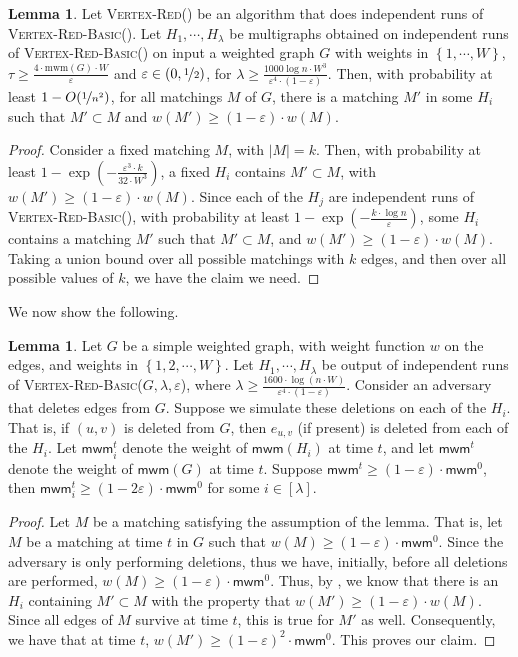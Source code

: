 \documentclass[a4paper,11pt]{article}
\newcommand{\card}[1]{|#1|}
\newcommand{\paren}[1]{\left ( #1 \right )}
\newcommand{\set}[1]{\ensuremath{\left\{ #1 \right\}}}
\newcommand{\eps}{\varepsilon}
\theoremstyle{definition}
\theoremstyle{definition}
\theoremstyle{definition}
\theoremstyle{definition}
\theoremstyle{definition}
\newtheorem{lemma2}[definition2]{Lemma}
\theoremstyle{definition}
\theoremstyle{definition}
\theoremstyle{definition}
\theoremstyle{definition}
\theoremstyle{definition}
\theoremstyle{definition}
\theoremstyle{definition}
\theoremstyle{definition}
\theoremstyle{definition}
\theoremstyle{definition}
\begin{document}
\begin{lemma2}\label{lem:matchpreserve}
Let \textsc{Vertex-Red()} be an algorithm that does independent runs of \textsc{Vertex-Red-Basic}(). Let $H_1,\cdots, H_{\lambda}$ be multigraphs obtained on independent runs of \textsc{Vertex-Red-Basic}() on input a weighted graph $G$ with weights in $\set{1,\cdots, W}$, $\tau\geqslant \frac{4\cdot \text{mwm}(G)\cdot W}{\eps}$ and $\eps\in(0,\nicefrac{1}{2})$, for $\lambda \geqslant \frac{1000\log n\cdot W^3}{\eps^4\cdot (1-\eps)}$. Then, with probability at least $1-O(\nicefrac{1}{n^2})$, for all matchings $M$ of $G$, there is a matching $M'$ in some $H_i$ such that $M'\subset M$ and $w(M')\geqslant (1-\eps)\cdot w(M)$.  
\end{lemma2}
\begin{proof}
Consider a fixed matching $M$, with $\card{M}=k$.  Then, with probability at least $1-\exp\paren{-\frac{\eps^3\cdot k}{32\cdot W^3}}$, a fixed $H_i$ contains $M'\subset M$, with $w(M')\geqslant (1-\eps)\cdot w(M)$.  Since each of the $H_j$ are independent runs of \textsc{Vertex-Red-Basic}(), with probability at least  $1-\exp\paren{-\frac{k\cdot \log n}{\eps}}$, some $H_i$ contains a matching $M'$ such that $M'\subset M$, and $w(M')\geqslant (1-\eps)\cdot w(M)$. Taking a union bound over all possible matchings with $k$ edges, and then over all possible values of $k$, we have the claim we need. 
\end{proof}
We now show the following. 
\begin{lemma2}\label{lem:matchpreserve2}
Let $G$ be a simple weighted graph, with weight function $w$ on the edges, and weights in $\set{1,2,\cdots, W}$. Let $H_1,\cdots, H_{\lambda}$ be output of independent runs of \textsc{Vertex-Red-Basic}($G,\lambda, \eps$), where $\lambda \geqslant \frac{1600\cdot\log (n\cdot W)}{\eps^4\cdot (1-\eps)}$. Consider an adversary that deletes edges from $G$. Suppose we simulate these deletions on each of the $H_i$. That is, if $(u,v)$ is deleted from $G$, then $e_{u,v}$ (if present) is deleted from each of the $H_i$. Let $\textsf{mwm}_{i}^t$ denote the weight of $\textsf{mwm}(H_i)$ at time $t$, and let $\textsf{mwm}^t$ denote the weight of $\textsf{mwm}(G)$ at time $t$. Suppose $\textsf{mwm}^t\geqslant (1-\eps)\cdot \textsf{mwm}^0$, then $\textsf{mwm}_i^t\geqslant (1-2\eps)\cdot \textsf{mwm}^0$ for some $i\in [\lambda]$.
\end{lemma2}
\begin{proof}
Let $M$ be a matching satisfying the assumption of the lemma. That is, let $M$ be a matching at time $t$ in $G$ such that $w(M) \geqslant (1-\eps)\cdot \textsf{mwm}^0$. Since the adversary is only performing deletions, thus we have, initially, before all deletions are performed, $w(M)\geqslant (1-\eps)\cdot \textsf{mwm}^0$. Thus, by , we know that there is an $H_i$ containing $M'\subset M$ with the property that $w(M')\geqslant (1-\eps)\cdot w(M)$. Since all edges of $M$ survive at time $t$, this is true for $M'$ as well. Consequently, we have that at time $t$, $w(M')\geqslant (1-\eps)^2\cdot \textsf{mwm}^0$. This proves our claim. 
\end{proof}
\end{document}
